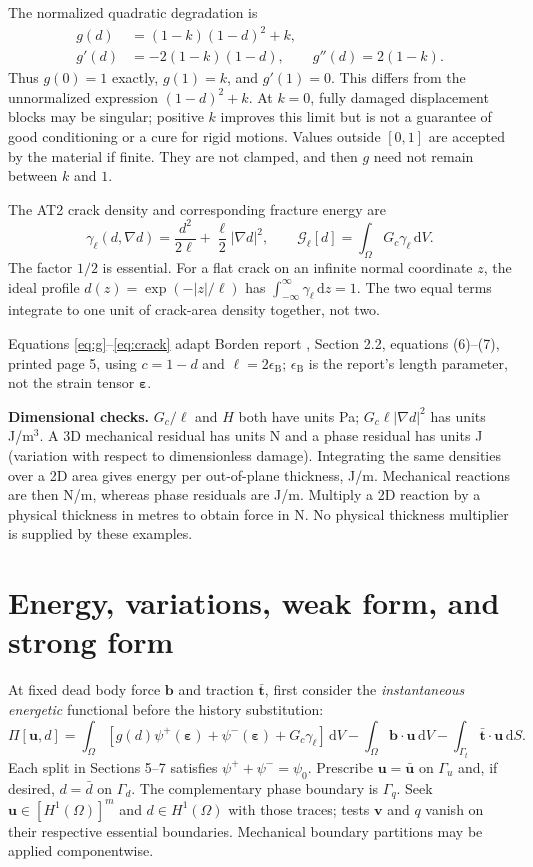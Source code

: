 \documentclass[11pt,a4paper]{article}
\newcommand{\eps}{\bm{\varepsilon}}
\newcommand{\uu}{\bm{u}}
\newcommand{\vv}{\bm{v}}
\newcommand{\dd}{\,\mathrm{d}}
\newcommand{\sectionpage}[1]{\clearpage\section{#1}}
\numberwithin{equation}{section}
\begin{document}
The normalized quadratic degradation is
\begin{align}
 g(d)&=(1-k)(1-d)^2+k,\label{eq:g}\\
 g'(d)&=-2(1-k)(1-d),\qquad g''(d)=2(1-k).
\end{align}
Thus $g(0)=1$ exactly, $g(1)=k$, and $g'(1)=0$. This differs from the
unnormalized expression $(1-d)^2+k$. At $k=0$, fully damaged displacement
blocks may be singular; positive $k$ improves this limit but is not a guarantee
of good conditioning or a cure for rigid motions. Values outside $[0,1]$ are
accepted by the material if finite. They are not clamped, and then $g$ need not
remain between $k$ and $1$.

The AT2 crack density and corresponding fracture energy are
\begin{equation}
 \gamma_\ell(d,\nabla d)=\frac{d^2}{2\ell}
      +\frac\ell2|\nabla d|^2,\qquad
 \mathcal G_\ell[d]=\int_\Omega G_c\gamma_\ell\dd V.\label{eq:crack}
\end{equation}
The factor $1/2$ is essential. For a flat crack on an infinite normal coordinate
$z$, the ideal profile $d(z)=\exp(-|z|/\ell)$ has
$\int_{-\infty}^{\infty}\gamma_\ell\dd z=1$. The two equal terms integrate to
one unit of crack-area density together, not two.

Equations \eqref{eq:g}--\eqref{eq:crack} adapt Borden report
\cite{borden}, Section 2.2, equations (6)--(7), printed page 5, using
$c=1-d$ and $\ell=2\epsilon_{\mathrm B}$; $\epsilon_{\mathrm B}$ is the
report's length parameter, not the strain tensor $\eps$.

\textbf{Dimensional checks.} $G_c/\ell$ and $H$ both have units Pa;
$G_c\ell|\nabla d|^2$ has units J/m$^3$. A 3D mechanical residual has units N
and a phase residual has units J (variation with respect to dimensionless
damage). Integrating the same densities over a 2D area gives energy per
out-of-plane thickness, J/m. Mechanical reactions are then N/m, whereas phase
residuals are J/m. Multiply a 2D reaction by a physical thickness in metres to
obtain force in N. No physical thickness multiplier is supplied by these examples.

\sectionpage{Energy, variations, weak form, and strong form}
\label{sec:forms}
At fixed dead body force $\bm b$ and traction $\bar{\bm t}$, first consider the
\emph{instantaneous energetic} functional before the history substitution:
\begin{equation}
 \Pi[\uu,d]=\int_\Omega\left[g(d)\psi^+(\eps)+\psi^-(\eps)
                  +G_c\gamma_\ell\right]\dd V
 -\int_\Omega\bm b\cdot\uu\dd V
 -\int_{\Gamma_t}\bar{\bm t}\cdot\uu\dd S.\label{eq:potential}
\end{equation}
Each split in Sections 5--7 satisfies $\psi^++\psi^-=\psi_0$.
Prescribe $\uu=\bar{\uu}$ on $\Gamma_u$ and, if desired, $d=\bar d$ on
$\Gamma_d$. The complementary phase boundary is $\Gamma_q$.
Seek $\uu\in[H^1(\Omega)]^m$ and $d\in H^1(\Omega)$ with those traces;
tests $\vv$ and $q$ vanish on their respective essential boundaries. Mechanical
boundary partitions may be applied componentwise.
\end{document}
